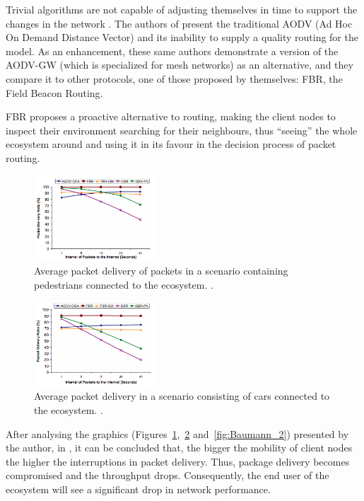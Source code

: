 \documentclass[10pt, conference, compsocconf]{IEEEtran}
\begin{document}
Trivial algorithms are not capable of adjusting themselves in time to support the changes in the network \cite{Baumann:4390832} \cite{Zhi:5364647} \cite{Song:5072224}. The authors of \cite{Baumann:4390832} present the traditional AODV (Ad Hoc On Demand Distance Vector) and its inability to supply a quality routing for the model. As an enhancement, these same authors demonstrate a version of the AODV-GW (which is specialized for mesh networks) as an alternative, and they compare it to other protocols, one of those proposed by themselves: FBR, the Field Beacon Routing.

FBR proposes a proactive alternative to routing, making the client nodes to inspect their environment searching for their neighbours, thus ``seeing'' the whole ecosystem around and using it in its favour in the decision process of packet routing.

\begin{figure}[h]
	\centering
	\includegraphics[width=0.4\textwidth]{./graphics/Baumann_1.png}
    \caption{ Average packet delivery of packets in a scenario containing pedestrians connected to the ecosystem. \cite{Baumann:4390832}.}
    \label{fig:Baumann_1}
\end{figure}

\begin{figure}[h]
	\centering
	\includegraphics[width=0.4\textwidth]{./graphics/Baumann_3.png}
    \caption{ Average packet delivery in a scenario consisting of cars connected to the ecosystem. \cite{Baumann:4390832}.}
    \label{fig:Baumann_3}
\end{figure}

After analysing the graphics (Figures~\ref{fig:Baumann_1},~\ref{fig:Baumann_3} and~\ref{fig:Baumann_2}) presented by the author, in \cite{Baumann:4390832}, it can be concluded that, the bigger the mobility of client nodes the higher the interruptions in packet delivery. Thus, package delivery becomes compromised and the throughput drops. Consequently, the end user of the ecosystem will see a significant drop in network performance.
\end{document}
